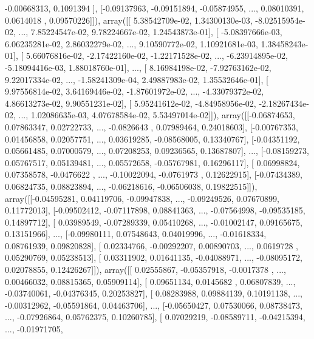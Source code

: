 \documentclass{article}
\begin{document}
        -0.00668313,  0.1091394 ],
       [-0.09137963, -0.09151894, -0.05874955, ...,  0.08010391,
         0.0614018 ,  0.09570226]]), array([[  5.38542709e-02,   1.34300130e-03,  -8.02515954e-02, ...,
          7.85224547e-02,   9.78224667e-02,   1.24543873e-01],
       [ -5.08397666e-03,   6.06235281e-02,   2.86032279e-02, ...,
          9.10590772e-02,   1.10921681e-03,   1.38458243e-01],
       [  5.66076816e-02,  -2.17422160e-02,  -1.22171528e-02, ...,
         -6.23914895e-02,  -5.18094416e-03,   1.88018760e-01],
       ..., 
       [  8.16984198e-02,  -7.92763162e-02,   9.22017334e-02, ...,
         -1.58241309e-04,   2.49887983e-02,   1.35532646e-01],
       [  9.97556814e-02,   3.64169446e-02,  -1.87601972e-02, ...,
         -4.33079372e-02,   4.86613273e-02,   9.90551231e-02],
       [  5.95241612e-02,  -4.84958956e-02,  -2.18267434e-02, ...,
          1.02086635e-03,   4.07678584e-02,   5.53497014e-02]]), array([[-0.06874653,  0.07863347,  0.02722733, ..., -0.0826643 ,
         0.07989464,  0.24018603],
       [-0.00767353,  0.01456858,  0.02057751, ...,  0.03619285,
        -0.08568005,  0.13340767],
       [-0.04351192,  0.05661485,  0.07000579, ...,  0.07208253,
         0.09236565,  0.13687807],
       ..., 
       [-0.08159273,  0.05767517,  0.05139481, ...,  0.05572658,
        -0.05767981,  0.16296117],
       [ 0.06998824,  0.07358578, -0.0476622 , ..., -0.10022094,
        -0.0761973 ,  0.12622915],
       [-0.07434389,  0.06824735,  0.08823894, ..., -0.06218616,
        -0.06506038,  0.19822515]]), array([[-0.04595281,  0.04119706, -0.09947838, ..., -0.09249526,
         0.07670899,  0.11772013],
       [-0.09502412, -0.07117898,  0.08841363, ..., -0.07564998,
        -0.09535185,  0.14897712],
       [ 0.03989549, -0.07289339,  0.05410268, ..., -0.01002147,
         0.09165675,  0.13151966],
       ..., 
       [-0.09980111,  0.07548643,  0.04019996, ..., -0.01618334,
         0.08761939,  0.09820828],
       [ 0.02334766, -0.00292207,  0.00890703, ...,  0.0619728 ,
         0.05290769,  0.05238513],
       [ 0.03311902,  0.01641135, -0.04088971, ..., -0.08095172,
         0.02078855,  0.12426267]]), array([[ 0.02555867, -0.05357918, -0.0017378 , ...,  0.00466032,
         0.08815365,  0.05909114],
       [ 0.09651134,  0.0145682 ,  0.06807839, ..., -0.03740061,
        -0.04376345,  0.20253827],
       [ 0.08283988,  0.09884139,  0.10191138, ..., -0.00312962,
        -0.05591864,  0.04463706],
       ..., 
       [-0.05650427,  0.07530066,  0.08738473, ..., -0.07926864,
         0.05762375,  0.10260785],
       [ 0.07029219, -0.08589711, -0.04215394, ..., -0.01971705,
\end{document}
